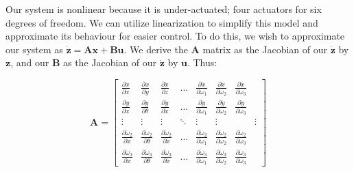 \documentclass{article}
\begin{document}
\begin{multicols}{2}
Our system is nonlinear because it is under-actuated; four actuators for six degrees of freedom. We can utilize linearization to simplify this model and approximate its behaviour for easier control. To do this, we wish to approximate our system as $\boldsymbol{\dot{z}}=\boldsymbol{A}\boldsymbol{x}+\boldsymbol{B}\boldsymbol{u}$. We derive the $\boldsymbol{A}$ matrix as the Jacobian of our $\boldsymbol{\dot{z}}$ by $\boldsymbol{z}$, and our $\boldsymbol{B}$ as the Jacobian of our $\boldsymbol{\dot{z}}$ by $\boldsymbol{u}$. Thus:

\begin{equation}
    \boldsymbol{A} = \begin{bmatrix}
        \frac{\partial \dot{x}}{\partial x} &
        \frac{\partial \dot{x}}{\partial y} &
        \frac{\partial \dot{x}}{\partial z} &
        \dots &
        \frac{\partial \dot{x}}{\partial \omega_1} &
        \frac{\partial \dot{x}}{\partial \omega_2} &
        \frac{\partial \dot{x}}{\partial \omega_3}
        \\[4pt]
        \frac{\partial \dot{y}}{\partial x} &
        \frac{\partial \dot{y}}{\partial \theta} &
        \frac{\partial \dot{y}}{\partial \dot{x}} &
        \dots &
        \frac{\partial \dot{y}}{\partial \omega_1} &
        \frac{\partial \dot{y}}{\partial \omega_2} &
        \frac{\partial \dot{y}}{\partial \omega_3}
        \\[4pt]
        \vdots & \vdots & \vdots & \ddots & \vdots & \vdots & & \vdots
        \\[4pt]
        \frac{\partial \dot{\omega}_2}{\partial x} &
        \frac{\partial \dot{\omega}_2}{\partial \theta} &
        \frac{\partial \dot{\omega}_2}{\partial \dot{x}} &
        \dots &
        \frac{\partial \dot{\omega}_2}{\partial \omega_1} &
        \frac{\partial \dot{\omega}_2}{\partial \omega_2} & 
        \frac{\partial \dot{\omega}_2}{\partial \omega_3} 
        \\[4pt]
        \frac{\partial \dot{\omega}_3}{\partial x} &
        \frac{\partial \dot{\omega}_3}{\partial \theta} &
        \frac{\partial \dot{\omega}_3}{\partial \dot{x}} &
        \dots &
        \frac{\partial \dot{\omega}_3}{\partial \omega_1} &
        \frac{\partial \dot{\omega}_3}{\partial \omega_2} &
        \frac{\partial \dot{\omega}_3}{\partial \omega_3}
    \end{bmatrix}
\end{equation}


\end{multicols}
\end{document}
